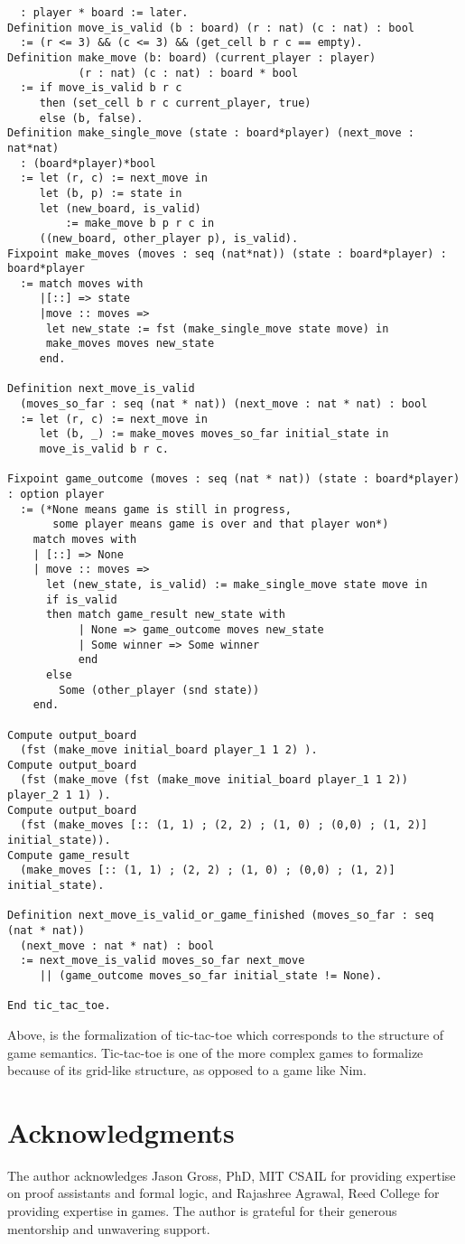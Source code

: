 \documentclass{article}
\theoremstyle{definition}
\begin{document}
\begin{verbatim}
  : player * board := later.
Definition move_is_valid (b : board) (r : nat) (c : nat) : bool 
  := (r <= 3) && (c <= 3) && (get_cell b r c == empty).
Definition make_move (b: board) (current_player : player) 
           (r : nat) (c : nat) : board * bool 
  := if move_is_valid b r c
     then (set_cell b r c current_player, true)
     else (b, false).
Definition make_single_move (state : board*player) (next_move : nat*nat)
  : (board*player)*bool 
  := let (r, c) := next_move in
     let (b, p) := state in 
     let (new_board, is_valid) 
         := make_move b p r c in 
     ((new_board, other_player p), is_valid).
Fixpoint make_moves (moves : seq (nat*nat)) (state : board*player) : board*player 
  := match moves with
     |[::] => state
     |move :: moves =>
      let new_state := fst (make_single_move state move) in
      make_moves moves new_state
     end.

Definition next_move_is_valid
  (moves_so_far : seq (nat * nat)) (next_move : nat * nat) : bool 
  := let (r, c) := next_move in 
     let (b, _) := make_moves moves_so_far initial_state in 
     move_is_valid b r c.

Fixpoint game_outcome (moves : seq (nat * nat)) (state : board*player) : option player 
  := (*None means game is still in progress,
       some player means game is over and that player won*)
    match moves with 
    | [::] => None 
    | move :: moves =>
      let (new_state, is_valid) := make_single_move state move in 
      if is_valid 
      then match game_result new_state with 
           | None => game_outcome moves new_state
           | Some winner => Some winner
           end
      else
        Some (other_player (snd state)) 
    end.

Compute output_board 
  (fst (make_move initial_board player_1 1 2) ).
Compute output_board
  (fst (make_move (fst (make_move initial_board player_1 1 2)) player_2 1 1) ).
Compute output_board
  (fst (make_moves [:: (1, 1) ; (2, 2) ; (1, 0) ; (0,0) ; (1, 2)] initial_state)).
Compute game_result
  (make_moves [:: (1, 1) ; (2, 2) ; (1, 0) ; (0,0) ; (1, 2)] initial_state).

Definition next_move_is_valid_or_game_finished (moves_so_far : seq (nat * nat))
  (next_move : nat * nat) : bool 
  := next_move_is_valid moves_so_far next_move
     || (game_outcome moves_so_far initial_state != None).

End tic_tac_toe.
\end{verbatim}

Above, is the formalization of tic-tac-toe which corresponds to the structure of game semantics. Tic-tac-toe is one of the more complex games to formalize because of its grid-like structure, as opposed to a game like Nim.

\section{Acknowledgments}
The author acknowledges Jason Gross, PhD, MIT CSAIL for providing expertise on proof assistants and formal logic, and Rajashree Agrawal, Reed College for providing expertise in games. The author is grateful for their generous mentorship and unwavering support.


\nocite{*}
\printbibliography[title={Bibliography},heading=bibnumbered]
\end{document}
